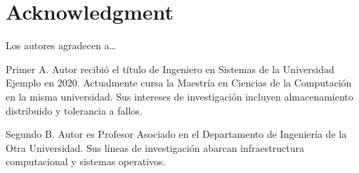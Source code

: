 \documentclass[journal]{IEEEtran}
\begin{document}
\section*{Acknowledgment}
Los autores agradecen a\ldots




\begin{IEEEbiographynophoto}{Primer A. Autor}
  recibió el título de Ingeniero en Sistemas de la Universidad Ejemplo en 2020.
  Actualmente cursa la Maestría en Ciencias de la Computación en la misma
  universidad. Sus intereses de investigación incluyen almacenamiento
  distribuido y tolerancia a fallos.
\end{IEEEbiographynophoto}

\begin{IEEEbiographynophoto}{Segundo B. Autor}
  es Profesor Asociado en el Departamento de Ingeniería de la Otra Universidad.
  Sus líneas de investigación abarcan infraestructura computacional y sistemas
  operativos.
\end{IEEEbiographynophoto}

\end{document}
